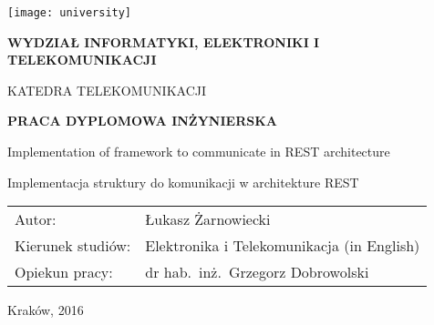 \begin{titlepage}
    \begin{center}
        \texttt{[image: university]}

        \vspace*{1cm}
        \textbf{\uppercase{Wydział Informatyki, Elektroniki i Telekomunikacji}}

        \small
        \vspace*{0.5cm}
        \uppercase{Katedra Telekomunikacji}

        \vspace{2cm}
        \large
        \textbf{PRACA DYPLOMOWA INŻYNIERSKA}

        \vspace{2cm}
        \Large
        Implementation of framework to communicate in REST architecture

        \normalsize
        \vspace{1cm}
        Implementacja struktury do komunikacji w architekture REST

        \small
        \vspace{2cm}
        \begin{flushleft}
            \begin{tabular}{p{5cm}l}
            Autor: & Łukasz Żarnowiecki \\
            Kierunek studiów: & Elektronika i Telekomunikacja (in English) \\
            Opiekun pracy: & dr hab.\ inż.\ Grzegorz Dobrowolski
            \end{tabular}
        \end{flushleft}

        \vfill
        Kraków, 2016

    \end{center}
\end{titlepage}
